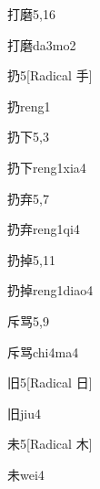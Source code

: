 \begin{entry}{打磨}{5,16}
  \begin{phonetics}{打磨}{da3mo2}
  \end{phonetics}
\end{entry}

\begin{entry}{扔}{5}[Radical 手]
  \begin{phonetics}{扔}{reng1}
  \end{phonetics}
\end{entry}

\begin{entry}{扔下}{5,3}
  \begin{phonetics}{扔下}{reng1xia4}
  \end{phonetics}
\end{entry}

\begin{entry}{扔弃}{5,7}
  \begin{phonetics}{扔弃}{reng1qi4}
  \end{phonetics}
\end{entry}

\begin{entry}{扔掉}{5,11}
  \begin{phonetics}{扔掉}{reng1diao4}
  \end{phonetics}
\end{entry}

\begin{entry}{斥骂}{5,9}
  \begin{phonetics}{斥骂}{chi4ma4}
  \end{phonetics}
\end{entry}

\begin{entry}{旧}{5}[Radical 日]
  \begin{phonetics}{旧}{jiu4}
  \end{phonetics}
\end{entry}

\begin{entry}{未}{5}[Radical 木]
  \begin{phonetics}{未}{wei4}
  \end{phonetics}
\end{entry}

